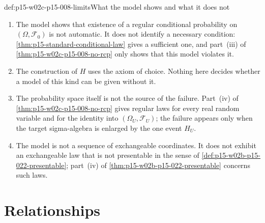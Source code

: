 \begin{hbwarning}{def:p15-w02c-p15-008-limits}{What the model shows and what it does not}
\begin{enumerate}
\item The model shows that existence of a regular conditional probability
      on \((\Omega,\mathcal F_0)\) is not automatic. It does not identify a
      necessary condition: \cref{thm:p15-standard-conditional-law} gives a
      sufficient one, and part~(iii) of
      \cref{thm:p15-w02c-p15-008-no-rcp} only shows that this model
      violates it.
\item The construction of \(H\) uses the axiom of choice. Nothing here
      decides whether a model of this kind can be given without it.
\item The probability space itself is not the source of the failure.
      Part~(iv) of \cref{thm:p15-w02c-p15-008-no-rcp} gives regular laws
      for every real random variable and for the identity into
      \((\Omega_U,\mathcal F_U)\); the failure appears only when the target
      sigma-algebra is enlarged by the one event \(H_U\).
\item The model is not a sequence of exchangeable coordinates. It does not
      exhibit an exchangeable law that is not presentable in the sense of
      \cref{def:p15-w02b-p15-022-presentable}; part~(iv) of
      \cref{thm:p15-w02b-p15-022-presentable} concerns such laws.
\end{enumerate}
\end{hbwarning}

\section{Relationships}
\label{sec:p15-w02c-p15-008-relationships}

